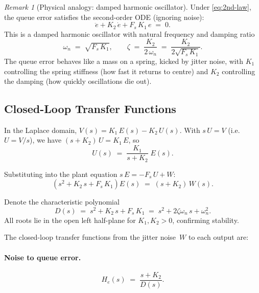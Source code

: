 \documentclass[11pt, a4paper]{article}
\theoremstyle{definition}
\theoremstyle{plain}
\theoremstyle{remark}
\newtheorem{remark}{Remark}[section]
\begin{document}
\begin{remark}[Physical analogy: damped harmonic oscillator]
  Under \eqref{eq:2nd-law}, the queue error satisfies the
  second-order ODE (ignoring noise):
  \begin{equation}\label{eq:damped-oscillator}
    \ddot{e} + K_2\,\dot{e} + F_s\,K_1\,e \;=\; 0.
  \end{equation}
  This is a damped harmonic oscillator with natural frequency and
  damping ratio
  \begin{equation}\label{eq:oscillator-params}
    \omega_n \;=\; \sqrt{F_s\,K_1},
    \qquad
    \zeta \;=\; \frac{K_2}{2\,\omega_n}
         \;=\; \frac{K_2}{2\sqrt{F_s\,K_1}}.
  \end{equation}
  The queue error behaves like a mass on a spring, kicked by jitter
  noise, with $K_1$ controlling the spring stiffness (how fast it
  returns to centre) and $K_2$ controlling the damping (how quickly
  oscillations die out).
\end{remark}

\subsection{Closed-Loop Transfer Functions}\label{sec:2nd-tf}

In the Laplace domain, $V(s) = K_1\,E(s) - K_2\,U(s)$.
With $s\,U = V$ (i.e.\ $U = V/s$), we have
$(s + K_2)\,U = K_1\,E$, so
\begin{equation}\label{eq:2nd-U-E}
  U(s) \;=\; \frac{K_1}{s + K_2}\;E(s).
\end{equation}

Substituting into the plant equation $s\,E = -F_s\,U + W$:
\begin{equation}\label{eq:2nd-char}
  \left(s^2 + K_2\,s + F_s\,K_1\right) E(s)
    \;=\; (s + K_2)\,W(s).
\end{equation}

Denote the characteristic polynomial
\begin{equation}\label{eq:char-poly}
  D(s) \;=\; s^2 + K_2\,s + F_s\,K_1
       \;=\; s^2 + 2\zeta\omega_n\,s + \omega_n^2.
\end{equation}
All roots lie in the open left half-plane for $K_1, K_2 > 0$,
confirming stability.

The closed-loop transfer functions from the jitter noise~$W$ to
each output are:

\paragraph{Noise to queue error.}
\begin{equation}\label{eq:2nd-tf-e}
  H_e(s) \;=\; \frac{s + K_2}{D(s)}.
\end{equation}
\end{document}
